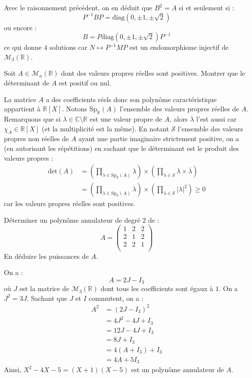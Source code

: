 \documentclass[a4paper,10pt]{report}
\begin{document}
\begin{enumerate}
\medskip

\noindent Avec le raisonnement précédent, on en déduit que $B^2=A$ si et seulement si :
$$ P^{-1} B P = \textrm{diag}(0, \pm 1, \pm \sqrt{2})$$
ou encore :
$$ B = P \textrm{diag}(0, \pm 1, \pm \sqrt{2}) P^{-1}$$
ce qui donne $4$ solutions car $N \mapsto P^{-1}MP$ est un endomorphisme injectif de $\mathcal{M}_3(\mathbb{R})$.
\end{enumerate}

\begin{Exa} Soit $A \in \mathcal{M}_{n}(\mathbb{R})$ dont des valeurs propres réelles sont positives. Montrer que le déterminant de $A$ est positif ou nul.
\end{Exa} 

\corr La matrice $A$ a des coefficients réels donc son polynôme caractéristique appartient à $\mathbb{R}[X]$. Notons $\textrm{Sp}_{\mathbb{R}}(A)$ l'ensemble des valeurs propres réelles de $A$. Remarquons que si $\lambda \in \mathbb{C} \setminus \mathbb{R}$ est une valeur propre de $A$, alors $\overline{\lambda}$ l'est aussi car $\chi_A \in \mathbb{R}[X]$ (et la multiplicité est la même). En notant $\mathcal{S}$ l'ensemble des valeurs propres non réelles de $A$ ayant une partie imaginaire strictement positive, on a (en autorisant les répétitions) en sachant que le déterminant est le produit des valeurs propres :
\begin{align*}
 \textrm{det}(A) & = \left(\prod_{ \lambda \in \textrm{Sp}_{\mathbb{R}}(A)} \lambda \right) \times \left(\prod_{ \lambda \in \mathcal{S}} \lambda  \times \overline{\lambda }\right)  \\
&  = \left(\prod_{ \lambda \in \textrm{Sp}_{\mathbb{R}}(A)} \lambda \right) \times \left(\prod_{ \lambda \in \mathcal{S}} \vert \lambda \vert ^2\right) \geq 0 
 \end{align*}
  car les valeurs propres réelles sont positives.

 
 
\begin{Exa} Déterminer un polynôme annulateur de degré $2$ de :
$$ A = \begin{pmatrix}
1 & 2 & 2 \\
2 & 1 & 2 \\
2 & 2 & 1 \\
\end{pmatrix}$$
En déduire les puissances de $A$. 
\end{Exa}

\corr On a :
$$ A= 2J-I_3$$
où $J$ est la matrice de $\mathcal{M}_3(\mathbb{R})$ dont tous les coefficients sont égaux à $1$. On a $J^2=3J$. Sachant que $J$ et $I$ commutent, on a :
\begin{align*}
A^2 & = (2J-I_3)^2 \\
& = 4J^2 - 4J+ I_3 \\
& = 12J-4J+I_3 \\
& = 8J+I_3 \\
& = 4(A+I_3) + I_3 \\
& = 4A +5I_3
\end{align*}
Ainsi, $X^2-4X-5=(X+1)(X-5)$ est un polynôme annulateur de $A$.
\end{document}
